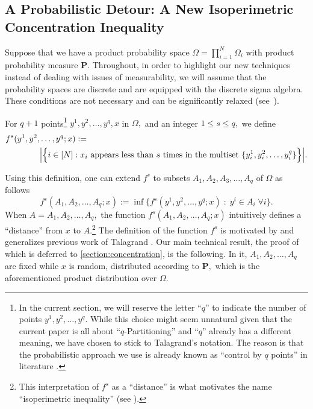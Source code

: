 \documentclass[11pt]{article}\usepackage{amsfonts}
\numberwithin{theorem}{subsection}
\newcommand{\prob}{\mathbf{P}}
\begin{document}
\subsection{A Probabilistic Detour: A New Isoperimetric Concentration Inequality}
\label{section:detourisoperimetry}
Suppose that we have a product probability space $\Omega = \prod_{i=1}^N \Omega_i$ with product probability measure $\prob.$ Throughout, in order to highlight our new techniques instead of dealing with issues of measurability, we will assume that the probability spaces are discrete and are equipped with the discrete sigma algebra. These conditions are not necessary and can be significantly relaxed (see~\cite[Section 2.1]{Talagrand01}).

For  $q+1$ points\footnote{In the current section, we will reserve the letter ``$q$'' to indicate the number of points $y^1, y^2,\ldots, y^{q}.$ While this choice might seem unnatural given that the current paper is all about ``$q$-Partitioning''  and ``$q$'' already has a different meaning, we have chosen to stick to Talagrand's notation. The reason is that the probabilistic approach we use is already known as ``control by $q$ points'' in literature \cite[Section 3]{Talagrand01}.} $y^1, y^2,\ldots, y^{q}, x$ in $\Omega,$ and an integer $1\le s \le q,$ we define
\begin{equation}\label{eq:definefs}
\begin{split}
    f^s(y^1, y^2,  & \ldots, y^q; x) :=\\
       & \Big{|}\Big{\{}i\in [N]: x_i \text{ appears less than $s$ times in the multiset }  \{y^1_i, y^2_i, \ldots, y^q_i\}\Big{\}}\Big{|}.
\end{split}
\end{equation}
       
\noindent
Using this definition, one can extend $f^s$ to subsets $A_1, A_2, A_3, \ldots, A_q$ of $\Omega$ as follows
$$
       f^s(A_1, A_2, \ldots, A_q; x) := 
       \inf\{f^s(y^1, y^2, \ldots, y^q; x) \; : \; y^i\in A_i\; \forall i\}.
$$
When $A = A_1, A_2, \ldots, A_q,$ the function $f^s(A_1, A_2, \ldots, A_q; x)$ intuitively defines a ``distance'' from $x$ to $A.$\footnote{This interpretation of $f^s$ as a ``distance'' is what motivates the name ``isoperimetric inequality'' (see \cite{Talagrand01}).} The definition of the function $f^s$ is motivated by and generalizes previous work of Talagrand \cite{Talagrand01,Talagrand96}. Our main technical result, the proof of which is deferred to 
\cref{section:concentration}, is the following. In it, $A_1, A_2, \ldots, A_q$ are fixed while $x$ is random, distributed according to $\prob,$ which is the aforementioned product distribution over $\Omega.$
\end{document}
